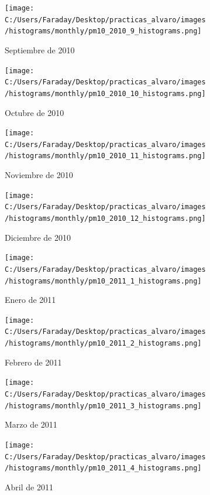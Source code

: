 \documentclass[12pt]{article}
\begin{document}
\begin{figure}[H]
\centering
\begin{subfigure}[h]{0.45\textwidth}
\texttt{[image: C:/Users/Faraday/Desktop/practicas\_alvaro/images/histograms/monthly/pm10\_2010\_9\_histograms.png]}
\caption{Septiembre de 2010}
\label{fig:hist-mon-3-9-2010}
\end{subfigure}
%
\begin{subfigure}[H]{0.45\textwidth}
\texttt{[image: C:/Users/Faraday/Desktop/practicas\_alvaro/images/histograms/monthly/pm10\_2010\_10\_histograms.png]}
\caption{Octubre de 2010}
\label{fig:hist-mon-3-10-2010}
\end{subfigure}
\caption{}
\end{figure}

\begin{figure}[H]
\centering
\begin{subfigure}[h]{0.45\textwidth}
\texttt{[image: C:/Users/Faraday/Desktop/practicas\_alvaro/images/histograms/monthly/pm10\_2010\_11\_histograms.png]}
\caption{Noviembre de 2010}
\label{fig:hist-mon-3-11-2010}
\end{subfigure}
%
\begin{subfigure}[H]{0.45\textwidth}
\texttt{[image: C:/Users/Faraday/Desktop/practicas\_alvaro/images/histograms/monthly/pm10\_2010\_12\_histograms.png]}
\caption{Diciembre de 2010}
\label{fig:hist-mon-3-12-2010}
\end{subfigure}
\caption{}
\end{figure}

\newpage

\begin{figure}[H]
\centering
\begin{subfigure}[h]{0.45\textwidth}
\texttt{[image: C:/Users/Faraday/Desktop/practicas\_alvaro/images/histograms/monthly/pm10\_2011\_1\_histograms.png]}
\caption{Enero de 2011}
\label{fig:hist-mon-3-1-2011}
\end{subfigure}
%
\begin{subfigure}[H]{0.45\textwidth}
\texttt{[image: C:/Users/Faraday/Desktop/practicas\_alvaro/images/histograms/monthly/pm10\_2011\_2\_histograms.png]}
\caption{Febrero de 2011}
\label{fig:hist-mon-3-2-2011}
\end{subfigure}
\caption{}
\end{figure}

\begin{figure}[H]
\centering
\begin{subfigure}[h]{0.45\textwidth}
\texttt{[image: C:/Users/Faraday/Desktop/practicas\_alvaro/images/histograms/monthly/pm10\_2011\_3\_histograms.png]}
\caption{Marzo de 2011}
\label{fig:hist-mon-3-3-2011}
\end{subfigure}
%
\begin{subfigure}[H]{0.45\textwidth}
\texttt{[image: C:/Users/Faraday/Desktop/practicas\_alvaro/images/histograms/monthly/pm10\_2011\_4\_histograms.png]}
\caption{Abril de 2011}
\label{fig:hist-mon-3-4-2011}
\end{subfigure}
\caption{}
\end{figure}
\end{document}
